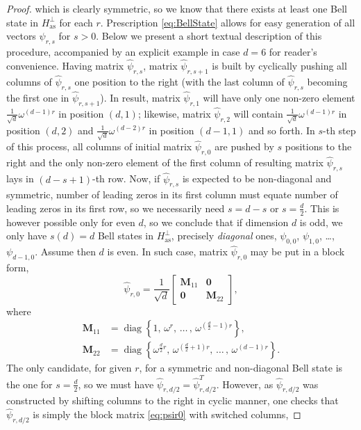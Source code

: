 \documentclass[reqno]{amsart}
\theoremstyle{plain}
\theoremstyle{note}
\newcommand{\aspace}{H_{\mathrm{as}}}
\newcommand\diag{\operatorname{diag}}
\begin{document}
\begin{proof}
which is clearly symmetric, so we know that there exists at least one Bell state in $H_{\mathrm{as}}^{\perp}$ for each $r$. Prescription \eqref{eq:BellState} allows for easy generation of all vectors $\psi_{r,s}$ for $s > 0$. Below we present a short textual description of this procedure, accompanied by an explicit example in case $d=6$ for reader's convenience. Having matrix $\hat{\psi}_{r,s}$, matrix $\hat{\psi}_{r,s+1}$ is built by cyclically pushing all columns of $\hat{\psi}_{r,s}$ one position to the right (with the last column of $\hat{\psi}_{r,s}$ becoming the first one in $\hat{\psi}_{r,s+1}$). In result, matrix $\hat{\psi}_{r,1}$ will have only one non-zero element $\frac{1}{\sqrt{d}}\omega^{(d-1)r}$ in  position $(d,1)$; likewise, matrix $\hat{\psi}_{r,2}$ will contain $\frac{1}{\sqrt{d}}\omega^{(d-1)r}$ in position $(d,2)$ and $\frac{1}{\sqrt{d}}\omega^{(d-2)r}$ in position $(d-1,1)$ and so forth. In $s$-th step of this process, all columns of initial matrix $\hat{\psi}_{r,0}$ are pushed by $s$ positions to the right and the only non-zero element of the first column of resulting matrix $\hat{\psi}_{r,s}$ lays in $(d-s+1)$-th row. Now, if $\hat{\psi}_{r,s}$ is expected to be non-diagonal and symmetric, number of leading zeros in its first column must equate number of leading zeros in its first row, so we necessarily need $s = d-s$ or $s = \frac{d}{2}$. This is however possible only for even $d$, so we conclude that if dimension $d$ is odd, we only have $s(d) = d$ Bell states in $\aspace^\perp$, precisely \emph{diagonal} ones, $\psi_{0,0}$, $\psi_{1,0}$, \ldots , $\psi_{d-1,0}$. Assume then $d$ is even. In such case, matrix $\hat{\psi}_{r,0}$ may be put in a block form,
\begin{equation}\label{eq:psir0}
    \hat{\psi}_{r,0} = \frac{1}{\sqrt{d}} \left[ \begin{array}{c|c} \mathbf{M}_{11} & \mathbf{0} \\ \hline \mathbf{0} & \mathbf{M}_{22} \end{array} \right],
\end{equation}
where
\begin{align}
    \mathbf{M}_{11} &= \diag\left\{1,\, \omega^{r}, \, \ldots \, , \, \omega^{\left( \frac{d}{2}-1\right) r}\right\},\\
    \mathbf{M}_{22} &= \diag\left\{\omega^{\frac{d}{2}r},\, \omega^{\left( \frac{d}{2}+1\right) r}, \, \ldots \, , \, \omega^{(d-1) r}\right\}.\nonumber
\end{align}
The only candidate, for given $r$, for a symmetric and non-diagonal Bell state is the one for $s = \frac{d}{2}$, so we must have $\hat{\psi}_{r,d/2} = \hat{\psi}_{r,d/2}^{T}$. However, as $\hat{\psi}_{r,d/2}$ was constructed by shifting columns to the right in cyclic manner, one checks that $\hat{\psi}_{r,d/2}$ is simply the block matrix \eqref{eq:psir0} with switched columns,

\end{proof}
\end{document}
